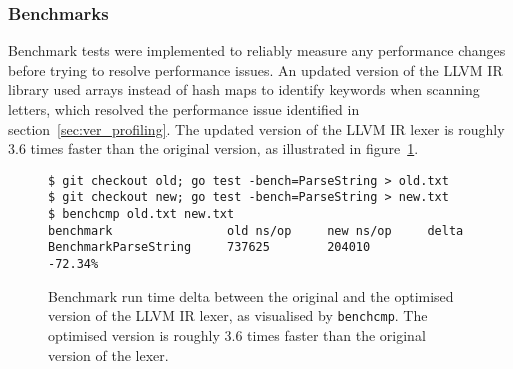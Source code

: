 
\subsubsection{Benchmarks}
\label{sec:ver_benchmarks}

Benchmark tests were implemented to reliably measure any performance changes before trying to resolve performance issues. An updated version of the LLVM IR library used arrays instead of hash maps to identify keywords when scanning letters, which resolved the performance issue identified in section~\ref{sec:ver_profiling}. The updated version of the LLVM IR lexer is roughly 3.6 times faster than the original version, as illustrated in figure~\ref{fig:benchmark_delta}.

\begin{figure}[htbp]
	\begin{center}
		\begin{BVerbatim}
$ git checkout old; go test -bench=ParseString > old.txt
$ git checkout new; go test -bench=ParseString > new.txt
$ benchcmp old.txt new.txt
benchmark                old ns/op     new ns/op     delta
BenchmarkParseString     737625        204010        -72.34%
		\end{BVerbatim}
		\caption{Benchmark run time delta between the original and the optimised version of the LLVM IR lexer, as visualised by \texttt{benchcmp}\protect\footnotemark. The optimised version is roughly 3.6 times faster than the original version of the lexer.}
		\label{fig:benchmark_delta}
	\end{center}
\end{figure}

